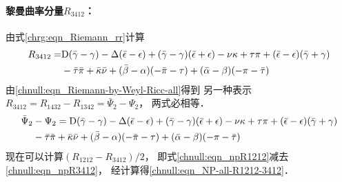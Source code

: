 \paragraph{黎曼曲率分量$R_{3412}$：}
由式\eqref{chrg:eqn_Riemann_rr}计算
\begin{align*}
    R_{3412}
    =& {\rm D} (\bar{\gamma}-\gamma) -\Delta (\bar{\epsilon}-\epsilon)
    + (\bar{\gamma}-\gamma) (\bar{\epsilon}+\epsilon)
    - \nu \kappa  + \tau\pi
    +  (\bar{\epsilon}-\epsilon) (\bar{\gamma}+\gamma)\\
    &- \bar{\tau} \bar{\pi} + \bar{\kappa} \bar{\nu}
    +  (\bar{\beta}-\alpha) (-\bar{\pi} -\tau  )
    +  (\bar{\alpha}-\beta) (-\pi -\bar{\tau}  )
\end{align*}
由\eqref{chnull:eqn_Riemann-by-Weyl-Ricc-all}得到
另一种表示$R_{3412}=R_{1432}-R_{1342}=\bar{\Psi}_{2} - \Psi_2 $，
两式必相等．
\begin{align}
        \bar{\Psi}_{2} &- \Psi_2  =
        {\rm D} (\bar{\gamma}-\gamma) -\Delta (\bar{\epsilon}-\epsilon)
        + (\bar{\gamma}-\gamma) (\bar{\epsilon}+\epsilon)
        - \nu \kappa  + \tau\pi
        +  (\bar{\epsilon}-\epsilon) (\bar{\gamma}+\gamma) \notag \\
        &- \bar{\tau} \bar{\pi} + \bar{\kappa} \bar{\nu}
        +  (\bar{\beta}-\alpha) (-\bar{\pi} -\tau  )
        +  (\bar{\alpha}-\beta) (-\pi -\bar{\tau}  ) \label{chnull:eqn_npR3412}
    \end{align}
现在可以计算$(R_{1212}-R_{3412})/2$，
即式\eqref{chnull:eqn_npR1212}减去\eqref{chnull:eqn_npR3412}，
经计算得\eqref{chnull:eqn_NP-all-R1212-3412}．

